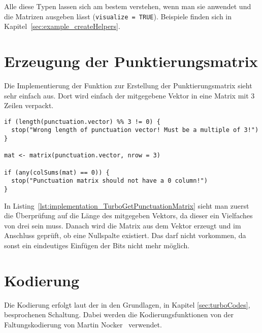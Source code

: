 Alle diese Typen lassen sich am bestem verstehen, wenn man sie anwendet und die Matrizen ausgeben lässt (\texttt{visualize = TRUE}). Beispiele finden sich in Kapitel~\ref{sec:example_createHelpers}.

\FloatBarrier
\section{Erzeugung der Punktierungsmatrix}
\label{sec:implementation_puncturing}
Die Implementierung der Funktion zur Erstellung der Punktierungsmatrix sieht sehr einfach aus. Dort wird einfach der mitgegebene Vektor in eine Matrix mit 3 Zeilen verpackt. 

\begin{lstlisting}[caption=Implementierung von \texttt{TurboGetPunctuationMatrix}, label={lst:implementation_TurboGetPunctuationMatrix}, float=!th]
if (length(punctuation.vector) %% 3 != 0) {
  stop("Wrong length of punctuation vector! Must be a multiple of 3!")
}

mat <- matrix(punctuation.vector, nrow = 3)

if (any(colSums(mat) == 0)) {
  stop("Punctuation matrix should not have a 0 column!")
}
\end{lstlisting}

In Listing~\ref{lst:implementation_TurboGetPunctuationMatrix} sieht man zuerst die Überprüfung auf die Länge des mitgegeben Vektors, da dieser ein Vielfaches von drei sein muss. Danach wird die Matrix aus dem Vektor erzeugt und im Anschluss geprüft, ob eine Nullspalte existiert. Das darf nicht vorkommen, da sonst ein eindeutiges Einfügen der Bits nicht mehr möglich.

\FloatBarrier
\section{Kodierung}
\label{sec:implementation_encode}
Die Kodierung erfolgt laut der in den Grundlagen, in Kapitel \ref{sec:turboCodes}, besprochenen Schaltung. Dabei werden die Kodierungsfunktionen von der Faltungskodierung von Martin Nocker~\cite[S.~26~f.]{nocker} verwendet.

